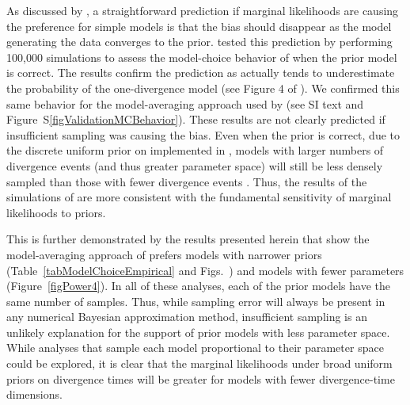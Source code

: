 As discussed by \citet{Oaks2012}, a straightforward prediction if marginal
likelihoods are causing the preference for simple models is that the bias should
disappear as the model generating the data converges to the prior.
\citet{Oaks2012} tested this prediction by performing 100,000 simulations to
assess the model-choice behavior of \msb when the prior model is correct.
The results confirm the prediction as \msb actually tends to underestimate
the probability of the one-divergence model (see Figure 4 of
\citet{Oaks2012}).
We confirmed this same behavior for the model-averaging approach used by
\citet{Hickerson2013} (see SI text and Figure~S\ref{figValidationMCBehavior}).
These results are not clearly predicted if insufficient sampling was causing
the bias.
Even when the prior is correct, due to the discrete uniform prior on
\numt{} implemented in \msb, models with larger numbers of divergence
events (and thus greater parameter space) will still be less densely
sampled than those with fewer divergence events \citep{Oaks2012}.
Thus, the results of the simulations of \citet{Oaks2012} are more consistent
with the fundamental sensitivity of marginal likelihoods to priors.

This is further demonstrated by the results presented herein that show the
model-averaging approach of \citet{Hickerson2013} prefers models with narrower
\divt{} priors (Table~\ref{tabModelChoiceEmpirical} and
Figs.~)
and models with fewer \divt{} parameters (Figure~\ref{figPower4}).
In all of these analyses, each of the prior models have the same number of
samples.
Thus, while sampling error will always be present in any numerical Bayesian
approximation method, insufficient sampling is an unlikely explanation for the
support of prior models with less parameter space.
While analyses that sample each model proportional to their parameter space
could be explored, it is clear that the marginal likelihoods under broad
uniform priors on divergence times will be greater for models with fewer
divergence-time dimensions.




